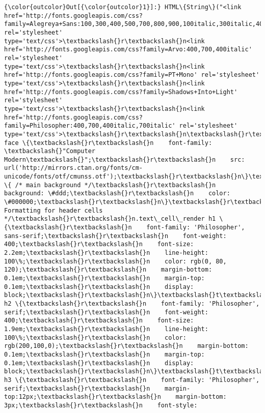 \documentclass[11pt]{article}
\begin{document}
\begin{Verbatim}[commandchars=\\\{\}]
{\color{outcolor}Out[{\color{outcolor}1}]:} HTML\{String\}("<link href='http://fonts.googleapis.com/css?family=Alegreya+Sans:100,300,400,500,700,800,900,100italic,300italic,400italic,500italic,700italic,800italic,900italic' rel='stylesheet' type='text/css'>\textbackslash{}r\textbackslash{}n<link href='http://fonts.googleapis.com/css?family=Arvo:400,700,400italic' rel='stylesheet' type='text/css'>\textbackslash{}r\textbackslash{}n<link href='http://fonts.googleapis.com/css?family=PT+Mono' rel='stylesheet' type='text/css'>\textbackslash{}r\textbackslash{}n<link href='http://fonts.googleapis.com/css?family=Shadows+Into+Light' rel='stylesheet' type='text/css'>\textbackslash{}r\textbackslash{}n<link href='http://fonts.googleapis.com/css?family=Philosopher:400,700,400italic,700italic' rel='stylesheet' type='text/css'>\textbackslash{}r\textbackslash{}n\textbackslash{}r\textbackslash{}n<style>\textbackslash{}r\textbackslash{}n\textbackslash{}r\textbackslash{}n@font-face \{\textbackslash{}r\textbackslash{}n    font-family: \textbackslash{}"Computer Modern\textbackslash{}";\textbackslash{}r\textbackslash{}n    src: url('http://mirrors.ctan.org/fonts/cm-unicode/fonts/otf/cmunss.otf');\textbackslash{}r\textbackslash{}n\}\textbackslash{}r\textbackslash{}n\textbackslash{}r\textbackslash{}n\#notebook\_panel \{ /* main background */\textbackslash{}r\textbackslash{}n    background: \#ddd;\textbackslash{}r\textbackslash{}n    color: \#000000;\textbackslash{}r\textbackslash{}n\}\textbackslash{}r\textbackslash{}n\textbackslash{}r\textbackslash{}n\textbackslash{}r\textbackslash{}n\textbackslash{}r\textbackslash{}n/* Formatting for header cells */\textbackslash{}r\textbackslash{}n.text\_cell\_render h1 \{\textbackslash{}r\textbackslash{}n    font-family: 'Philosopher', sans-serif;\textbackslash{}r\textbackslash{}n    font-weight: 400;\textbackslash{}r\textbackslash{}n    font-size: 2.2em;\textbackslash{}r\textbackslash{}n    line-height: 100\%;\textbackslash{}r\textbackslash{}n    color: rgb(0, 80, 120);\textbackslash{}r\textbackslash{}n    margin-bottom: 0.1em;\textbackslash{}r\textbackslash{}n    margin-top: 0.1em;\textbackslash{}r\textbackslash{}n    display: block;\textbackslash{}r\textbackslash{}n\}\textbackslash{}t\textbackslash{}r\textbackslash{}n.text\_cell\_render h2 \{\textbackslash{}r\textbackslash{}n    font-family: 'Philosopher', serif;\textbackslash{}r\textbackslash{}n    font-weight: 400;\textbackslash{}r\textbackslash{}n    font-size: 1.9em;\textbackslash{}r\textbackslash{}n    line-height: 100\%;\textbackslash{}r\textbackslash{}n    color: rgb(200,100,0);\textbackslash{}r\textbackslash{}n    margin-bottom: 0.1em;\textbackslash{}r\textbackslash{}n    margin-top: 0.1em;\textbackslash{}r\textbackslash{}n    display: block;\textbackslash{}r\textbackslash{}n\}\textbackslash{}t\textbackslash{}r\textbackslash{}n\textbackslash{}r\textbackslash{}n.text\_cell\_render h3 \{\textbackslash{}r\textbackslash{}n    font-family: 'Philosopher', serif;\textbackslash{}r\textbackslash{}n    margin-top:12px;\textbackslash{}r\textbackslash{}n    margin-bottom: 3px;\textbackslash{}r\textbackslash{}n    font-style: 
\end{Verbatim}
\end{document}
